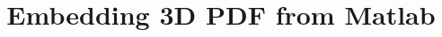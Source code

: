 \documentclass[a4paper]{article}
\begin{document}
	\title{Embedding 3D PDF from Matlab}
	
\end{document}
